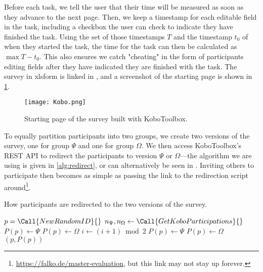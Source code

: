 \documentclass[../thesis]{subfiles}
\begin{document}
Before each task, we tell the user that their time will be measured as soon as they advance to the next page.
Then, we keep a timestamp for each editable field in the task, including a checkbox the user can check to indicate they have finished the task.
Using the set of those timestamps $T$ and the timestamp $t_0$ of when they started the task, the time for the task can then be calculated as $\max T - t_0$.
This also ensures we catch "cheating" in the form of participants editing fields after they have indicated they are finished with the task.
The survey in \gls{xlsform} is linked in , and a screenshot of the starting page is shown in \cref{fig:kobo}.

\begin{figure}
	\begin{center}
		\texttt{[image: Kobo.png]}
	\end{center}
	\caption{Starting page of the survey built with KoboToolbox.}\label{fig:kobo}
\end{figure}


To equally partition participants into two groups, we create two versions of the survey, one for group $\Psi$ and one for group $\Omega$.
We then access KoboToolbox's REST API to redirect the participants to version $\Psi$ or $\Omega$---the algorithm we are using is given in \cref{alg:redirect}, or can alternatively be seen in .
Inviting others to participate then becomes as simple as passing the link to the redirection script around\footnote{
	\url{https://falko.de/master-evaluation}, but this link may not stay up forever.
}.

\begin{algorithm}
	\tikzexternaldisable
	\caption{How participants are redirected to the two versions of the survey.}\label{alg:redirect}
	\begin{algorithmic}[1]
		\small
		\State $p = \Call{NewRandomID}{\null}$
		\EndIf
		\State $n_{\Psi}, n_{\Omega} \gets \Call{GetKoboParticipations}{\null}$
		\State $P(p) \gets \Psi$
		\Else
		\State $P(p) \gets \Omega$
		\EndIf
		\State $i \gets (i + 1) \bmod 2$
		\State $P(p) \gets \Psi$
		\Else
		\State $P(p) \gets \Omega$
		\EndIf
		\EndIf
		\State \Return $(p, P(p))$
	\end{algorithmic}
	\tikzexternalenable
\end{algorithm}
\end{document}
